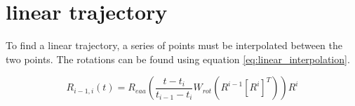 \documentclass[a4paper,10pt]{article}
\begin{document}
\section{linear trajectory}

To find a linear trajectory, a series of points must be interpolated between the two points. 
The rotations can be found using equation \ref{eq:linear_interpolation}.

\begin{equation}
  R_{i-1, i}(t) = R_{eaa} \left( \frac{t-t_i}{t_{i-1} - t_i} W_{rot} (R^{i-1} [R^i]^T)\right) R^i 
  \label{eq:linear_interpolation}
\end{equation}
\end{document}
